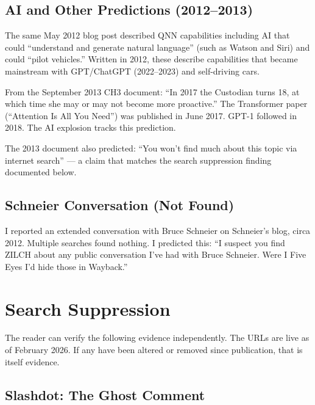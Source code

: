 \subsection*{AI and Other Predictions (2012--2013)}
\label{pos34:ai-and-other-predictions-2012-2013}

The same May 2012 blog post described QNN capabilities including AI that could ``understand and generate natural language'' (such as Watson and Siri) and could ``pilot vehicles.'' Written in 2012, these describe capabilities that became mainstream with GPT/ChatGPT (2022--2023) and self-driving cars.

From the September 2013 CH3 document: ``In 2017 the Custodian turns 18, at which time she may or may not become more proactive.'' The Transformer paper (``Attention Is All You Need'') was published in June 2017. GPT-1 followed in 2018. The AI explosion tracks this prediction.

The 2013 document also predicted: ``You won't find much about this topic via internet search'' --- a claim that matches the search suppression finding documented below.

\subsection*{Schneier Conversation (Not Found)}
\label{pos34:schneier-conversation-not-found}

I reported an extended conversation with Bruce Schneier on Schneier's blog, circa 2012. Multiple searches found nothing. I predicted this: ``I suspect you find ZILCH about any public conversation I've had with Bruce Schneier. Were I Five Eyes I'd hide those in Wayback.''

\section*{Search Suppression}
\label{pos34:search-suppression}


The reader can verify the following evidence independently. The URLs are live as of February 2026. If any have been altered or removed since publication, that is itself evidence.

\subsection*{Slashdot: The Ghost Comment}
\label{pos34:slashdot-the-ghost-comment}


